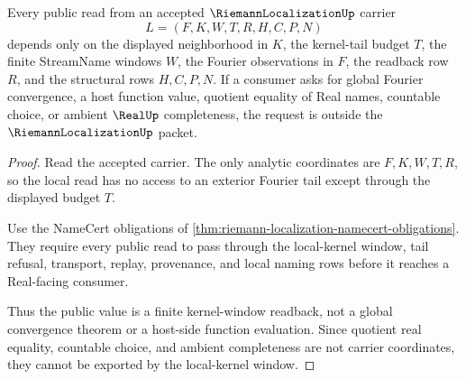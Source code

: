 \begin{theorem}
\label{thm:riemann-localization-local-kernel-window}
Every public read from an accepted $\RiemannLocalizationUp$ carrier
$$
L=(F,K,W,T,R,H,C,P,N)
$$
depends only on the displayed neighborhood in $K$, the kernel-tail budget $T$, the finite StreamName windows $W$, the Fourier observations in $F$, the readback row $R$, and the structural rows $H,C,P,N$. If a consumer asks for global Fourier convergence, a host function value, quotient equality of Real names, countable choice, or ambient $\RealUp$ completeness, the request is outside the $\RiemannLocalizationUp$ packet.
\end{theorem}
\begin{proof}
Read the accepted carrier. The only analytic coordinates are $F,K,W,T,R$, so the local read has no access to an exterior Fourier tail except through the displayed budget $T$.

Use the NameCert obligations of \autoref{thm:riemann-localization-namecert-obligations}. They require every public read to pass through the local-kernel window, tail refusal, transport, replay, provenance, and local naming rows before it reaches a Real-facing consumer.

Thus the public value is a finite kernel-window readback, not a global convergence theorem or a host-side function evaluation. Since quotient real equality, countable choice, and ambient completeness are not carrier coordinates, they cannot be exported by the local-kernel window.
\end{proof}




